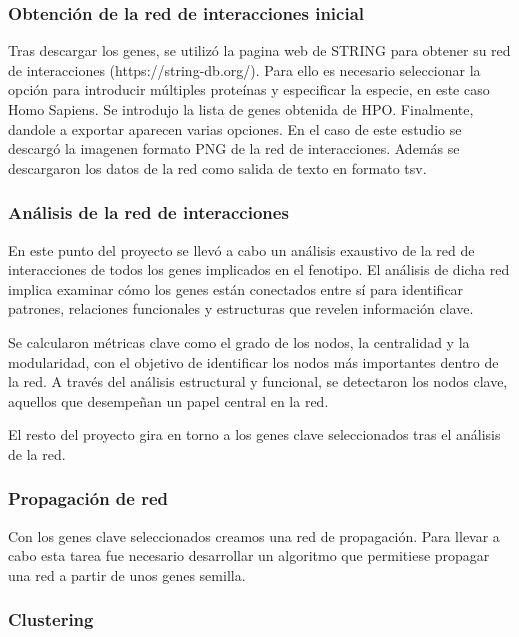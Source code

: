 \subsubsection{Obtención de la red de interacciones inicial}

Tras descargar los genes, se utilizó la pagina web de STRING para obtener su red de interacciones (https://string-db.org/). Para ello es necesario seleccionar la opción para introducir múltiples proteínas y especificar la especie, en este caso Homo Sapiens. Se introdujo la lista de genes obtenida de HPO. Finalmente, dandole a exportar aparecen varias opciones. En el caso de este estudio se descargó la imagenen formato PNG de la red de interacciones. Además se descargaron los datos de la red como salida de texto en formato tsv.


\subsubsection{Análisis de la red de interacciones}

En este punto del proyecto se llevó a cabo un análisis exaustivo de la red de interacciones de todos los genes implicados en el fenotipo. El análisis de dicha red  implica examinar cómo los genes están conectados entre sí para identificar patrones, relaciones funcionales y estructuras que revelen información clave. 

Se calcularon métricas clave como el grado de los nodos, la centralidad y la modularidad, con el objetivo de identificar los nodos más importantes dentro de la red. A través del análisis estructural y funcional, se detectaron los nodos clave, aquellos que desempeñan un papel central en la red.

El resto del proyecto gira en torno a los genes clave seleccionados tras el análisis de la red.

\subsubsection{Propagación de red}

Con los genes clave seleccionados creamos una red de propagación. Para llevar a cabo esta tarea fue necesario desarrollar un algoritmo que permitiese propagar una red a partir de unos genes semilla.

\subsubsection{Clustering}

